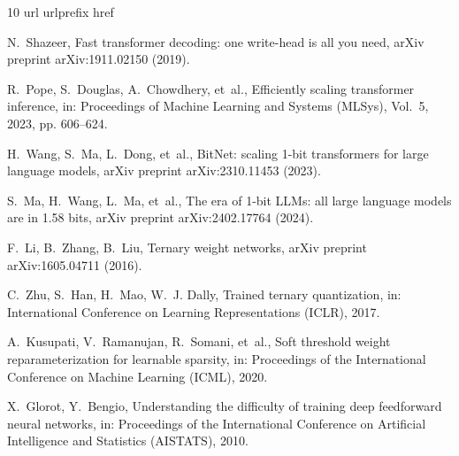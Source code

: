 \documentclass[final,5p,times,twocolumn]{elsarticle}
\theoremstyle{remark}
\begin{document}

\begin{thebibliography}{10}
\expandafter\ifx\csname url\endcsname\relax
  \def\url#1{\texttt{#1}}\fi
\expandafter\ifx\csname urlprefix\endcsname\relax\def\urlprefix{URL }\fi
\expandafter\ifx\csname href\endcsname\relax
  \def\href#1#2{#2} \def\path#1{#1}\fi

N.~Shazeer, {Fast transformer decoding: one write-head is all you need}, arXiv
  preprint arXiv:1911.02150 (2019).

R.~Pope, S.~Douglas, A.~Chowdhery, et~al., {Efficiently scaling transformer
  inference}, in: Proceedings of Machine Learning and Systems (MLSys), Vol.~5,
  2023, pp. 606--624.

H.~Wang, S.~Ma, L.~Dong, et~al., {BitNet: scaling 1-bit transformers for large
  language models}, arXiv preprint arXiv:2310.11453 (2023).

S.~Ma, H.~Wang, L.~Ma, et~al., {The era of 1-bit LLMs: all large language
  models are in 1.58 bits}, arXiv preprint arXiv:2402.17764 (2024).

F.~Li, B.~Zhang, B.~Liu, {Ternary weight networks}, arXiv preprint
  arXiv:1605.04711 (2016).

C.~Zhu, S.~Han, H.~Mao, W.~J. Dally, {Trained ternary quantization}, in:
  International Conference on Learning Representations (ICLR), 2017.

A.~Kusupati, V.~Ramanujan, R.~Somani, et~al., {Soft threshold weight
  reparameterization for learnable sparsity}, in: Proceedings of the
  International Conference on Machine Learning (ICML), 2020.

X.~Glorot, Y.~Bengio, {Understanding the difficulty of training deep
  feedforward neural networks}, in: Proceedings of the International Conference
  on Artificial Intelligence and Statistics (AISTATS), 2010.


\end{thebibliography}
\end{document}
